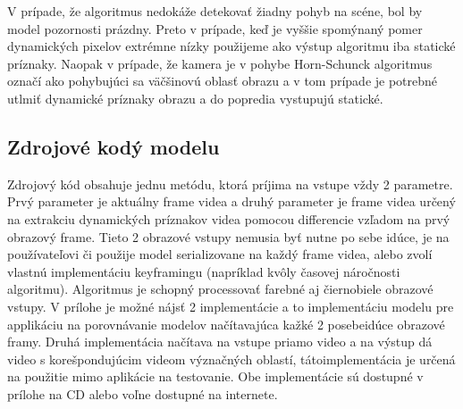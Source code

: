 V prípade, že algoritmus nedokáže detekovať žiadny pohyb na scéne, bol by model pozornosti prázdny.
Preto v prípade, keď je vyššie spomýnaný pomer dynamických pixelov extrémne nízky použijeme ako výstup algoritmu iba statické príznaky.
Naopak v prípade, že kamera je v pohybe Horn-Schunck algoritmus označí ako pohybujúci sa väčšinovú oblasť obrazu a v tom prípade je potrebné utlmiť dynamické príznaky obrazu a do popredia vystupujú statické.

\subsection{Zdrojové kodý modelu}
Zdrojový kód obsahuje jednu metódu, ktorá príjima na vstupe vždy 2 parametre.
Prvý parameter je aktuálny frame videa a druhý parameter je frame videa určený na extrakciu dynamických príznakov videa pomocou differencie vzľadom na prvý obrazový frame.
Tieto 2 obrazové vstupy nemusia byť nutne po sebe idúce, je na používateľovi či použije model serializovane na každý frame videa, alebo zvolí vlastnú implementáciu keyframingu (napríklad kvôly časovej náročnosti algoritmu).
Algoritmus je schopný processovať farebné aj čiernobiele obrazové vstupy.
V prílohe je možné nájsť 2 implementácie a to implementáciu modelu pre applikáciu na porovnávanie modelov načítavajúca kažké 2 posebeidúce obrazové framy.
Druhá implementácia načítava na vstupe priamo video a na výstup dá video s korešpondujúcim videom význačných oblastí, tátoimplementácia je určená na použitie mimo aplikácie na testovanie.
Obe implementácie sú dostupné v prílohe na CD alebo voľne dostupné na internete.

